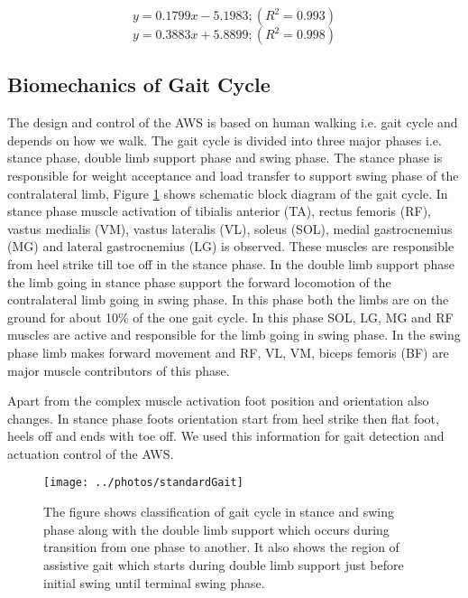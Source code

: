 \documentclass[letterpaper, 10 pt, conference]{ieeeconf}  %
\begin{document}
\begin{equation}\label{pgmunstreched}
y=0.1799x - 5.1983; (R^2=0.993)
\end{equation}
\begin{equation}\label{pgmstreched}
y = 0.3883x + 5.8899; (R^2=0.998)
\end{equation}

\subsection{Biomechanics of Gait Cycle } \label{gaitcycle}
The design and control of the AWS is based on human walking i.e. gait cycle and depends on how we walk. The gait cycle is divided into three major phases i.e. stance phase, double limb support phase and swing phase. The stance phase is responsible for weight acceptance and load transfer to support swing phase of the contralateral limb, Figure \ref{fig:standardgait} shows schematic block diagram of the gait cycle. In stance phase muscle activation of tibialis anterior (TA), rectus femoris (RF), vastus medialis (VM), vastus lateralis (VL), soleus (SOL), medial gastrocnemius (MG) and lateral gastrocnemius (LG) is observed. These muscles are responsible from heel strike till toe off in the stance phase. In the double limb support phase the limb going in stance phase support the forward locomotion of the contralateral limb going in swing phase. In this phase both the limbs are on the ground for about 10\% of the one gait cycle. In this phase SOL, LG, MG and RF muscles are active and responsible for the limb going in swing phase. In the swing phase limb makes forward movement and RF, VL, VM, biceps femoris (BF) are major muscle contributors of this phase. 

Apart from the complex muscle activation foot position and orientation also changes. In stance phase foots orientation start from heel strike then flat foot, heels off and ends with toe off. We used this information for gait detection and actuation control of the AWS.
\begin{figure}
	\centering
	\texttt{[image: ../photos/standardGait]}
	\caption{The figure shows classification of gait cycle in stance and swing phase along with the double limb support which occurs during transition from one phase to another. It also shows the region of assistive gait which starts during double limb support just before initial swing until terminal swing phase.}
	\label{fig:standardgait}
\end{figure}
\end{document}
